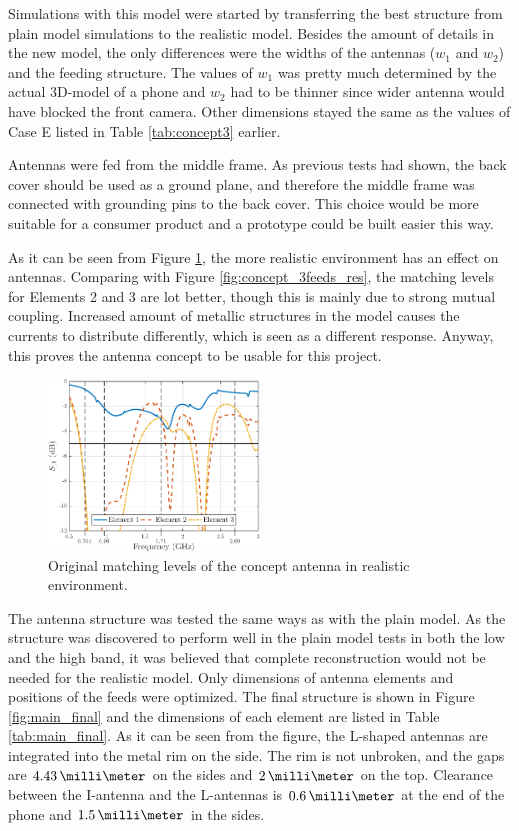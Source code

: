 Simulations with this model were started by transferring the best structure from plain model simulations to the realistic model. Besides the amount of details in the new model, the only differences were the widths of the antennas ($w_1$ and $w_2$) and the feeding structure. The values of $w_1$ was pretty much determined by the actual 3D-model of a phone and $w_2$ had to be thinner since wider antenna would have blocked the front camera. Other dimensions stayed the same as the values of Case E listed in Table \ref{tab:concept3} earlier.

Antennas were fed from the middle frame. As previous tests had shown, the back cover should be used as a ground plane, and therefore the middle frame was connected with grounding pins to the back cover. This choice would be more suitable for a consumer product and a prototype could be built easier this way. 

As it can be seen from Figure \ref{fig:main_orig}, the more realistic environment has an effect on antennas. Comparing with Figure \ref{fig:concept_3feeds_res}, the matching levels for Elements 2 and 3 are lot better, though this is mainly due to strong mutual coupling. Increased amount of metallic structures in the model causes the currents to distribute differently, which is seen as a different response. Anyway, this proves the antenna concept to be usable for this project.
\begin{figure}[H]
    \centering
    \includegraphics[width=0.5\textwidth]{img/main_orig.eps}
    \caption{Original matching levels of the concept antenna in realistic environment.}
    \label{fig:main_orig}
\end{figure}

The antenna structure was tested the same ways as with the plain model. As the structure was discovered to perform well in the plain model tests in both the low and the high band, it was believed that complete reconstruction would not be needed for the realistic model. Only dimensions of antenna elements and positions of the feeds were optimized. The final structure is shown in Figure \ref{fig:main_final} and the dimensions of each element are listed in Table \ref{tab:main_final}. As it can be seen from the figure, the L-shaped antennas are integrated into the metal rim on the side. The rim is not unbroken, and the gaps are $4.43\,\milli\meter$ on the sides and $2\,\milli\meter$ on the top. Clearance between the I-antenna and the L-antennas is $0.6\,\milli\meter$ at the end of the phone and $1.5\,\milli\meter$ in the sides.

